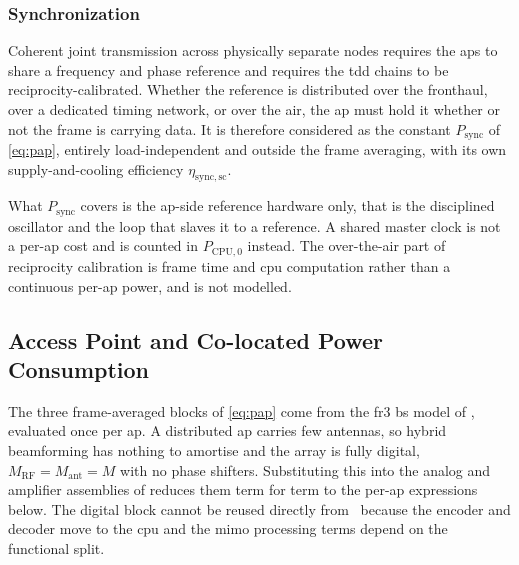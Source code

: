 \subsubsection{Synchronization}
\label{sssec:sync}
Coherent joint transmission across physically separate nodes requires the
\glspl{ap} to share a frequency and phase reference and requires the \gls{tdd}
chains to be reciprocity-calibrated. Whether the reference is distributed over the fronthaul, over
a dedicated timing network, or over the air, the \gls{ap} must hold it whether
or not the frame is carrying data. It is therefore considered as the constant
$P_{\mathrm{sync}}$ of \eqref{eq:pap}, entirely load-independent and outside the
frame averaging, with its own supply-and-cooling efficiency
$\eta_{\mathrm{sync,sc}}$.

What $P_{\mathrm{sync}}$ covers is the \gls{ap}-side reference hardware only,
that is the disciplined oscillator and the loop that slaves it to a reference.
A shared master clock is not a per-\gls{ap} cost and is counted in
$P_{\mathrm{CPU},0}$ instead. The over-the-air part of reciprocity calibration
is frame time and \gls{cpu} computation rather than a continuous per-\gls{ap}
power, and is not modelled.

\subsection{Access Point and Co-located Power Consumption}
\label{ssec:ap}

The three frame-averaged blocks of \eqref{eq:pap} come from the \gls{fr3}
\gls{bs} model of \cite{peschiera2026fr3}, evaluated once per \gls{ap}. A distributed \gls{ap} carries few antennas, so hybrid
beamforming has nothing to amortise and the array is fully digital,
$M_{\mathrm{RF}}=M_{\mathrm{ant}}=M$ with no phase shifters. Substituting this
into the analog and amplifier assemblies of \cite{peschiera2026fr3} reduces them
term for term to the per-\gls{ap} expressions below. The digital block cannot be reused directly from~\cite{peschiera2026fr3} because the encoder and decoder move to the \gls{cpu} and the \gls{mimo} processing terms
depend on the functional split.

